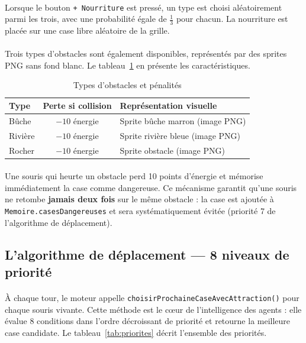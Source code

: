 \paragraph{} Lorsque le bouton \texttt{+ Nourriture} est pressé, un type est choisi aléatoirement parmi les trois, avec une probabilité égale de $\frac{1}{3}$ pour chacun. La nourriture est placée sur une case libre aléatoire de la grille.

\paragraph{} Trois types d'obstacles sont également disponibles, représentés par des sprites PNG sans fond blanc. Le tableau~\ref{tab:obstacles} en présente les caractéristiques.

\begin{table}[h!]
\centering
\renewcommand{\arraystretch}{1.4}
\begin{tabular}{|l|c|p{6cm}|}
\hline
\textbf{Type} & \textbf{Perte si collision} & \textbf{Représentation visuelle} \\
\hline
Bûche & $-10$ énergie & Sprite bûche marron (image PNG) \\
Rivière & $-10$ énergie & Sprite rivière bleue (image PNG) \\
Rocher & $-10$ énergie & Sprite obstacle (image PNG) \\
\hline
\end{tabular}
\caption{Types d'obstacles et pénalités}
\label{tab:obstacles}
\end{table}

\paragraph{} Une souris qui heurte un obstacle perd 10 points d'énergie et mémorise immédiatement la case comme dangereuse. Ce mécanisme garantit qu'une souris ne retombe \textbf{jamais deux fois} sur le même obstacle : la case est ajoutée à \texttt{Memoire.casesDangereuses} et sera systématiquement évitée (priorité 7 de l'algorithme de déplacement).

\bigskip

\subsection{L'algorithme de déplacement --- 8 niveaux de priorité}

\paragraph{} À chaque tour, le moteur appelle \texttt{choisirProchaineCaseAvecAttraction()} pour chaque souris vivante. Cette méthode est le cœur de l'intelligence des agents : elle évalue 8 conditions dans l'ordre décroissant de priorité et retourne la meilleure case candidate. Le tableau~\ref{tab:priorites} décrit l'ensemble des priorités.

